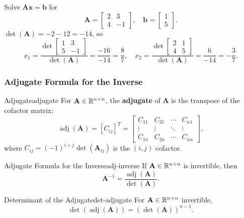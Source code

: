 \begin{example}
  Solve $\mathbf{A}\mathbf{x} = \mathbf{b}$ for
  \[
    \mathbf{A} =
    \begin{bmatrix}
      2 & 3 \\ 4 & -1
    \end{bmatrix}
    ,\quad
    \mathbf{b} =
    \begin{bmatrix}
      1 \\ 5
    \end{bmatrix}
    .
  \]
  $\det(\mathbf{A}) = -2 - 12 = -14$, so
  \[
    x_1 = \frac{\det
      \begin{bmatrix}
        1 & 3 \\ 5 & -1
      \end{bmatrix}
    }{\det(\mathbf{A})}
    = \frac{-16}{-14} = \frac{8}{7},
    \quad
    x_2 = \frac{\det
      \begin{bmatrix}
        2 & 1 \\ 4 & 5
      \end{bmatrix}
    }{\det(\mathbf{A})}
    = \frac{6}{-14} = -\frac{3}{7}.
  \]
\end{example}

\subsubsection{Adjugate Formula for the Inverse}

\begin{definition}{Adjugate}{adjugate}
  For $\mathbf{A} \in \mathbb{R}^{n \times n}$, the \textbf{adjugate} of $\mathbf{A}$ is the transpose of the cofactor matrix:
  \[
    \operatorname{adj}(\mathbf{A}) = [C_{ij}]^T =
    \begin{bmatrix}
      C_{11} & C_{21} & \cdots & C_{n1} \\
      \vdots & \vdots & \ddots & \vdots \\
      C_{1n} & C_{2n} & \cdots & C_{nn}
    \end{bmatrix}
    ,
  \]
  where $C_{ij} = (-1)^{i+j} \det(\mathbf{A}_{ij})$ is the $(i,j)$ cofactor.
\end{definition}

\begin{theorem}{Adjugate Formula for the Inverse}{adj-inverse}
  If $\mathbf{A} \in \mathbb{R}^{n \times n}$ is invertible, then
  \[
    \mathbf{A}^{-1} = \frac{\operatorname{adj}(\mathbf{A})}{\det(\mathbf{A})}.
  \]
\end{theorem}

\begin{theorem}{Determinant of the Adjugate}{det-adjugate}
  For $\mathbf{A} \in \mathbb{R}^{n \times n}$ invertible,
  \[
    \det(\operatorname{adj}(\mathbf{A})) = (\det(\mathbf{A}))^{n-1}.
  \]
\end{theorem}

